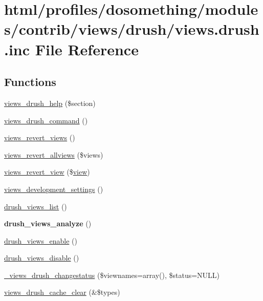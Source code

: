 \hypertarget{views_8drush_8inc}{
\section{html/profiles/dosomething/modules/contrib/views/drush/views.drush.inc File Reference}
\label{views_8drush_8inc}
}
\subsection*{Functions}
\begin{DoxyCompactItemize}
\item 
\hyperlink{views_8drush_8inc_a7de61c9b85a05e7d03205bdce0e9faeb}{views\_\-drush\_\-help} (\$section)
\item 
\hyperlink{views_8drush_8inc_a9b31019b890c3e853d82d989996240c2}{views\_\-drush\_\-command} ()
\item 
\hyperlink{views_8drush_8inc_ab7603b1903c64852058ca7c622eca5ff}{views\_\-revert\_\-views} ()
\item 
\hyperlink{views_8drush_8inc_a81bc2fddd56367b1bb295de134a0332f}{views\_\-revert\_\-allviews} (\$views)
\item 
\hyperlink{views_8drush_8inc_a8fdaa6d6c222e3f1866fe8232b20aa4a}{views\_\-revert\_\-view} (\$\hyperlink{classview}{view})
\item 
\hyperlink{views_8drush_8inc_a3b81c7ff5a735d7a023c6a8792a53e4a}{views\_\-development\_\-settings} ()
\item 
\hyperlink{views_8drush_8inc_a3579085e08bf50ff4595e0bcdde1e4ca}{drush\_\-views\_\-list} ()
\item 
\hypertarget{views_8drush_8inc_a5bef08605d0fc2679d2fcbc7a00aecc9}{
{\bfseries drush\_\-views\_\-analyze} ()}
\label{views_8drush_8inc_a5bef08605d0fc2679d2fcbc7a00aecc9}

\item 
\hyperlink{views_8drush_8inc_afb0fd06776785d9525080d414e981ccb}{drush\_\-views\_\-enable} ()
\item 
\hyperlink{views_8drush_8inc_a57c880b394aed2fcbc92df64aff008a5}{drush\_\-views\_\-disable} ()
\item 
\hyperlink{views_8drush_8inc_a62b117ad4cd01eafc92575eb5e37c59c}{\_\-views\_\-drush\_\-changestatus} (\$viewnames=array(), \$status=NULL)
\item 
\hyperlink{views_8drush_8inc_ac10f07a0abb48bc4ae5f54c86f6defbb}{views\_\-drush\_\-cache\_\-clear} (\&\$types)
\end{DoxyCompactItemize}


